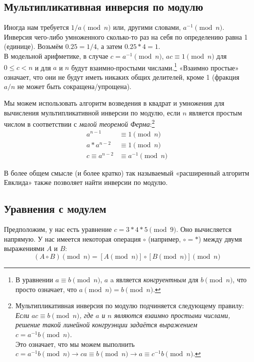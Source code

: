 \subsection{Мультипликативная инверсия по модулю}

Иногда нам требуется $1/a \pmod n$ или, другими словами, $a^{-1} \pmod n$. Инверсия чего-либо умноженного сколько-то раз на себя по определению равна 1 (единице). Возьмём $0.25 = 1/4$, а затем $0.25*4 = 1$.\\

В модельной арифметике, в случае $c = a^{-1} \pmod{n}$, $a c \equiv 1 \pmod{n}$ для $0 \leq c < n$ и для $a$ и $n$ будут взаимно-простыми числами.\footnote{В уравнении $a \equiv b \pmod{n}$, $a$ a является  {\em конгруентным} для $b \pmod{n}$, что просто означает, что \(a \pmod{n} = b \pmod{n}\).} «Взаимно простые» означает, что они не будут иметь никаких общих делителей, кроме 1 (фракция $a/n$ не может быть сокращена/упрощена).

Мы можем использовать алгоритм возведения в квадрат и умножения для вычисления муль\-типликативной инверсии по модулю, если $n$ является простым числом в соответствии с {\em малой теоремой Ферма}:\footnote{\label{inverse_rule_note}Мультипликативная инверсия по модулю подчиняется следующему правилу:\\
{\em Если $a c \equiv b \pmod{n}$, где $a$ и $n$ являются взаимно простыми числами, решение такой линейной конгруэнции задаётся выражением \(c = a^{-1} b \pmod{n}\).}\cite{wiki-modular-arithmetic}\\
Это означает, что мы можем выполнить $c = a^{-1} b \pmod n \rightarrow ca \equiv b \pmod n \rightarrow a \equiv c^{-1} b \pmod n$.}\vspace{.175cm}
\begin{align*} 
    a^{n-1} &\equiv 1 \pmod{n} \\
    a*a^{n-2} &\equiv 1 \pmod{n} \\
    c \equiv a^{n-2} &\equiv a^{-1} \pmod{n}
\end{align*}

В более общем смысле (и более кратко) так называемый «расширенный алгоритм Евклида» \cite{extended-euclidean} также позволяет найти инверсии по модулю.


\subsection{Уравнения с модулем}
\label{subsec:modular-equations}

Предположим, у нас есть уравнение $c = 3*4*5 \pmod 9$. Оно вычисляется напрямую. У нас имеется некоторая операция $\circ$ (например, $\circ = *$) между двумя выражениями $A$ и $B$:\vspace{.175cm}
\[(A \circ B)\pmod{n} = {[A\pmod {n}] \circ [B\pmod{n}]}\pmod{n}\]

